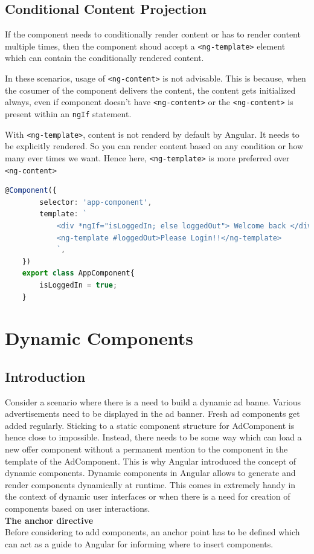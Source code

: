 \documentclass{report}
\begin{document}
\section{Conditional Content Projection}
If the component needs to conditionally render content or has to render content multiple times, then the component shoud accept a \lstinline{<ng-template>} element which can contain the conditionally rendered content.

In these scenarios, usage of \lstinline{<ng-content>} is not advisable. This is because, when the cosumer of the component delivers the content, the content gets initialized always, even if component doesn’t have \lstinline{<ng-content>} or the \lstinline{<ng-content>} is present within an \lstinline{ngIf} statement.

With \lstinline{<ng-template>}, content is not renderd by default by Angular. It needs to be explicitly rendered. So you can render content based on any condition or how many ever times we want. Hence here, \lstinline{<ng-template>} is more preferred over \lstinline{<ng-content>}

\begin{lstlisting}[caption=app.component.ts, language=Typescript]
	@Component({
		selector: 'app-component',
		template: `
			<div *ngIf="isLoggedIn; else loggedOut"> Welcome back </div>
			<ng-template #loggedOut>Please Login!!</ng-template>
			`,
	})
	export class AppComponent{
		isLoggedIn = true;
	}
\end{lstlisting}

\chapter{Dynamic Components}
\section{Introduction}
Consider a scenario where there is a need to build a dynamic ad banne.
Various advertisements need to be displayed in the ad banner.
Fresh ad components get added regularly.
Sticking to a static component structure for AdComponent is hence close to impossible.
Instead, there needs to be some way which can  load a new offer component without a permanent mention to the component in the template of the AdComponent.
This is why Angular introduced the concept of dynamic components.
Dynamic components in Angular allows to generate and render components dynamically at runtime.
This comes in extremely handy in the context of dynamic user interfaces or when there is a need for creation of components based on user interactions. \\
\textbf{The anchor directive} \\
Before considering to add components, an anchor point has to be defined which can act as a guide to Angular for informing where to insert components.
\end{document}
